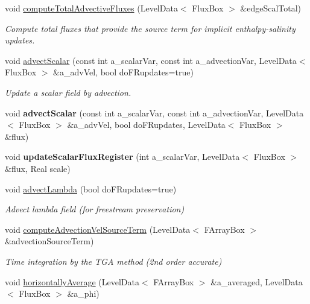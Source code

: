 \begin{DoxyCompactItemize}
\item 
void \hyperlink{class_a_m_r_level_mushy_layer_a8f04027bc844bd17a8bed1e073978436}{compute\-Total\-Advective\-Fluxes} (Level\-Data$<$ Flux\-Box $>$ \&edge\-Scal\-Total)
\begin{DoxyCompactList}\small\item\em Compute total fluxes that provide the source term for implicit enthalpy-\/salinity updates. \end{DoxyCompactList}\item 
void \hyperlink{class_a_m_r_level_mushy_layer_a367dd316723860bb7bd1c8b97895a3f4}{advect\-Scalar} (const int a\-\_\-scalar\-Var, const int a\-\_\-advection\-Var, Level\-Data$<$ Flux\-Box $>$ \&a\-\_\-adv\-Vel, bool do\-F\-Rupdates=true)
\begin{DoxyCompactList}\small\item\em Update a scalar field by advection. \end{DoxyCompactList}\item 
\hypertarget{class_a_m_r_level_mushy_layer_aec550a75ccdfb94eef6efb396228f075}{void {\bfseries advect\-Scalar} (const int a\-\_\-scalar\-Var, const int a\-\_\-advection\-Var, Level\-Data$<$ Flux\-Box $>$ \&a\-\_\-adv\-Vel, bool do\-F\-Rupdates, Level\-Data$<$ Flux\-Box $>$ \&flux)}\label{class_a_m_r_level_mushy_layer_aec550a75ccdfb94eef6efb396228f075}

\item 
\hypertarget{class_a_m_r_level_mushy_layer_a0d28eb0d78389d0fc13f0b6c69b8157b}{void {\bfseries update\-Scalar\-Flux\-Register} (int a\-\_\-scalar\-Var, Level\-Data$<$ Flux\-Box $>$ \&flux, Real scale)}\label{class_a_m_r_level_mushy_layer_a0d28eb0d78389d0fc13f0b6c69b8157b}

\item 
void \hyperlink{class_a_m_r_level_mushy_layer_acfd7a12794a564615d7b507717ea0d70}{advect\-Lambda} (bool do\-F\-Rupdates=true)
\begin{DoxyCompactList}\small\item\em Advect lambda field (for freestream preservation) \end{DoxyCompactList}\item 
void \hyperlink{class_a_m_r_level_mushy_layer_a4c5ae9f4b8016a17944e103389ac6c1f}{compute\-Advection\-Vel\-Source\-Term} (Level\-Data$<$ F\-Array\-Box $>$ \&advection\-Source\-Term)
\begin{DoxyCompactList}\small\item\em Time integration by the T\-G\-A method (2nd order accurate) \end{DoxyCompactList}\item 
\hypertarget{class_a_m_r_level_mushy_layer_a51a93e1db4963170b0cc831bf87bdbda}{void \hyperlink{class_a_m_r_level_mushy_layer_a51a93e1db4963170b0cc831bf87bdbda}{horizontally\-Average} (Level\-Data$<$ F\-Array\-Box $>$ \&a\-\_\-averaged, Level\-Data$<$ Flux\-Box $>$ \&a\-\_\-phi)}\label{class_a_m_r_level_mushy_layer_a51a93e1db4963170b0cc831bf87bdbda}


\end{DoxyCompactItemize}
